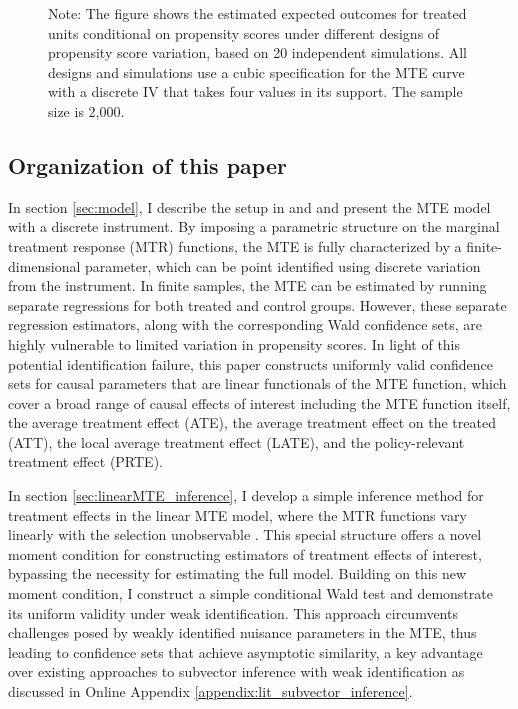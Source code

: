 \documentclass[11pt]{article}
\theoremstyle{definition}
\newcommand{\0}{\ensuremath{\mathbf{0}}}
\begin{document}
\begin{bibunit}
\begin{figure}[h!]
    \begin{tablenotes}
    \footnotesize \raggedright
    Note: The figure shows the estimated expected outcomes for treated units conditional on propensity scores under different designs of propensity score variation, based on 20 independent simulations. All designs and simulations use a cubic specification for the MTE curve with a discrete IV that takes four values in its support. The sample size is 2,000.
    \end{tablenotes}
    
\end{figure}

%

%

%

\subsection*{Organization of this paper}

In section \ref{sec:model}, I describe the setup in \cite{brinch/mogstad/wiswall:2017} and \cite{kline/walters:2019} and present the MTE model with a discrete instrument. By imposing a parametric structure on the marginal treatment response (MTR) functions, the MTE is fully characterized by a finite-dimensional parameter, which can be point identified using discrete variation from the instrument. In finite samples, the MTE can be estimated by running separate regressions for both treated and control groups. However, these separate regression estimators, along with the corresponding Wald confidence sets, are highly vulnerable to limited variation in propensity scores. In light of this potential identification failure, this paper constructs uniformly valid confidence sets for causal parameters that are linear functionals of the MTE function, which cover a broad range of causal effects of interest including the MTE function itself, the average treatment effect (ATE), the average treatment effect on the treated (ATT), the local average treatment effect (LATE), and the policy-relevant treatment effect (PRTE).


In section \ref{sec:linearMTE_inference}, I develop a simple inference method for treatment effects in the linear MTE model, where the MTR functions vary linearly with the selection unobservable \citep{brinch/mogstad/wiswall:2017}.  This special structure offers a novel moment condition for constructing estimators of treatment effects of interest, bypassing the necessity for estimating the full model.  Building on this new moment condition, I construct a simple conditional Wald test and demonstrate its uniform validity under weak identification. This approach circumvents challenges posed by weakly identified nuisance parameters in the MTE, thus leading to confidence sets that achieve asymptotic similarity, a key advantage over existing approaches to subvector inference with weak identification as discussed in Online Appendix \ref{appendix:lit_subvector_inference}.



\end{bibunit}
\end{document}
